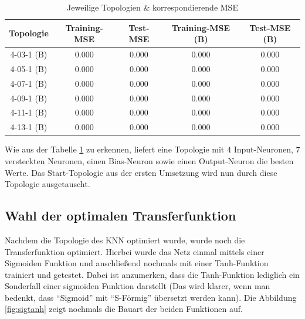 \begin{table}[H]
  \centering
  \begin{tabular}{|c|c|c|c|c|}
  \hline 
  \rule[0ex]{0pt}{2.5ex} Topologie & Training-MSE & Test-MSE & Training-MSE (B) & Test-MSE (B) \\ 
  \hline 
  \rule[0ex]{0pt}{2.5ex} 4-03-1 (B)& 0.000 & 0.000 & 0.000 & 0.000\\ 
  \hline 
  \rule[0ex]{0pt}{2.5ex} 4-05-1 (B)& 0.000 & 0.000 & 0.000 & 0.000\\ 
  \hline 
  \rule[0ex]{0pt}{2.5ex} 4-07-1 (B)& 0.000 & 0.000 & 0.000 & 0.000\\ 
  \hline 
  \rule[0ex]{0pt}{2.5ex} 4-09-1 (B)& 0.000 & 0.000 & 0.000 & 0.000\\ 
  \hline 
  \rule[0ex]{0pt}{2.5ex} 4-11-1 (B)& 0.000 & 0.000 & 0.000 & 0.000\\ 
  \hline 
  \rule[0ex]{0pt}{2.5ex} 4-13-1 (B)& 0.000 & 0.000 & 0.000 & 0.000\\ 
  \hline 
  \end{tabular} 
  \caption{Jeweilige Topologien \& korrespondierende MSE}
  \label{tab:TOPMSE}
\end{table}

Wie aus der Tabelle \ref{tab:TOPMSE} zu erkennen, liefert eine Topologie mit $4$ Input-Neuronen, $7$ versteckten Neuronen, einen Bias-Neuron sowie einen Output-Neuron die besten Werte. Das Start-Topologie aus der ersten Umsetzung wird nun durch diese Topologie ausgetauscht.

\subsection{Wahl der optimalen Transferfunktion} 
\label{subsection:Wahl der optimalen Transferfunktion} 

Nachdem die Topologie des KNN optimiert wurde, wurde noch die Transferfunktion optimiert. Hierbei wurde das Netz einmal mittels einer Sigmoiden Funktion und anschließend nochmals mit einer Tanh-Funktion trainiert und getestet. Dabei ist anzumerken, dass die Tanh-Funktion lediglich ein Sonderfall einer sigmoiden Funktion darstellt (Das wird klarer, wenn man bedenkt, dass "`Sigmoid"' mit "`S-Förmig"' übersetzt werden kann). Die Abbildung \ref{fig:sigtanh}
zeigt nochmals die Bauart der beiden Funktionen auf.

